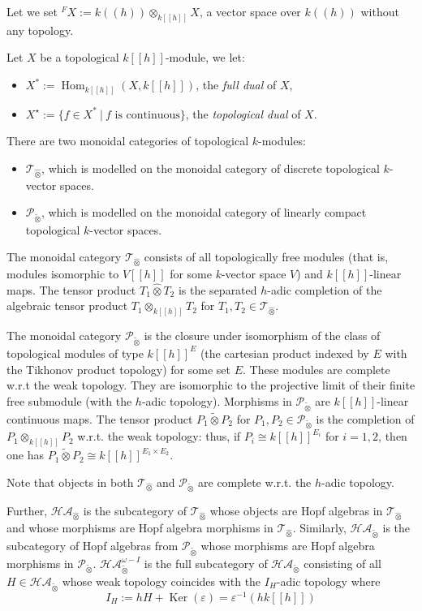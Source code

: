 \documentclass[8pt]{article}
\theoremstyle{definition}
\theoremstyle{definition}
\theoremstyle{definition}
\theoremstyle{definition}
\theoremstyle{definition}
\theoremstyle{definition}
\theoremstyle{definition}
\theoremstyle{definition}
\theoremstyle{definition}
\theoremstyle{definition}
\theoremstyle{definition}
\theoremstyle{definition}
\theoremstyle{definition}
\theoremstyle{definition}
\theoremstyle{question}
\newcommand{\tildetimes}[0]{\widetilde{\otimes}}
\begin{document}
Let we set ${}^F X := k((h)) \otimes_{k[[h]]} X$, a vector space over $k((h))$ without any topology. 

Let $X$ be a topological $k[[h]]$-module, we let:
\begin{itemize}
  \item $X^* := \operatorname{Hom}_{k[[h]]}(X, k[[h]])$, the \emph{full dual} of $X$,
  \item $X^{\star} := \{ f \in X^* \: | \: \text{$f$ is continuous}\}$, the \emph{topological dual} of $X$.
\end{itemize}

There are two monoidal categories of topological $k$-modules:
\begin{itemize}
  \item $\mathcal{T}_{\widehat{\otimes}}$, which is modelled on the monoidal category of discrete topological
  $k$-vector spaces.
  \item $\mathcal{P}_{\tildetimes}$, which is modelled on the monoidal category of linearly 
  compact topological $k$-vector spaces.
\end{itemize}

The monoidal category $\mathcal{T}_{\widehat{\otimes}}$ consists of all topologically free modules (that is, modules
isomorphic to $V[[h]]$ for some $k$-vector space $V$) and $k[[h]]$-linear maps. The tensor product $T_1 \widehat{\otimes} T_2$
is the separated $h$-adic completion of the algebraic tensor product $T_1 \otimes_{k[[h]]} T_2$ for $T_1, T_2 \in \mathcal{T}_{\widehat{\otimes}}$.

The monoidal category $\mathcal{P}_{\tildetimes}$ is the closure under isomorphism of the class of topological modules of type $k[[h]]^E$ 
(the cartesian product indexed by $E$ with the Tikhonov product topology) for some set $E$. These modules are complete w.r.t the weak topology.
They are isomorphic to the projective limit of their finite free submodule (with the $h$-adic topology). Morphisms
in $\mathcal{P}_{\tildetimes}$ are $k[[h]]$-linear continuous maps. The tensor product $P_1 \tildetimes P_2$
for $P_1, P_2 \in \mathcal{P}_{\tildetimes}$ is the completion of $P_1 \otimes_{k[[h]]} P_2$ w.r.t. the weak topology:
thus, if $P_i \cong k[[h]]^{E_i}$ for $i = 1,2$, then one has $P_1 \tildetimes P_2 \cong k[[h]]^{E_1 \times E_2}$.

Note that objects in both $\mathcal{T}_{\widehat{\otimes}}$ and $\mathcal{P}_{\tildetimes}$ are complete w.r.t. the $h$-adic topology.

Further, $\mathcal{HA}_{\widehat{\otimes}}$ is the subcategory of $\mathcal{T}_{\widehat{\otimes}}$ whose objects are Hopf algebras in 
$\mathcal{T}_{\widehat{\otimes}}$ and whose morphisms are Hopf algebra morphisms in $\mathcal{T}_{\widehat{\otimes}}$.
Similarly, $\mathcal{HA}_{\tildetimes}$ is the subcategory of Hopf algebras from $\mathcal{P}_{\tildetimes}$  whose morphisms
are Hopf algebra morphisms in $\mathcal{P}_{\tildetimes}$. $\mathcal{HA}^{\omega - I}_{\tildetimes}$ is the full subcategory
of $\mathcal{HA}_{\tildetimes}$ consisting of all $H \in \mathcal{HA}_{\tildetimes}$ whose weak topology coincides with the $I_H$-adic topology where
\[
I_H := hH + \operatorname{Ker}(\varepsilon) = \varepsilon^{-1}(h k [[h]])
\]
\end{document}
